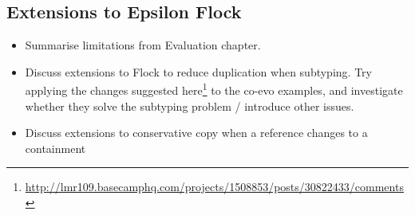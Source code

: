 \subsection{Extensions to Epsilon Flock}
\begin{itemize}
	\item Summarise limitations from Evaluation chapter.
	\item Discuss extensions to Flock to reduce duplication when subtyping.
	\subitem Try applying the changes suggested here\footnote{\url{http://lmr109.basecamphq.com/projects/1508853/posts/30822433/comments}} to the co-evo examples, and investigate whether they solve the subtyping problem / introduce other issues. 
	\item Discuss extensions to conservative copy when a reference changes to a containment
\end{itemize}